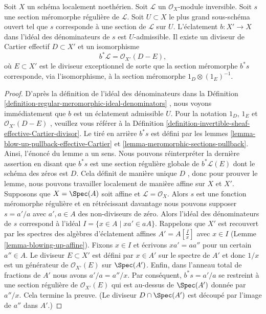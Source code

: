 \begin{lemma}
\label{lemma-blowing-up-denominators}
Soit  $X$  un schéma localement noethérien. Soit  $\mathcal{L}$  un
 $\mathcal{O}_X$-module inversible. Soit  $s$  une section méromorphe régulière
de  $\mathcal{L}$. Soit  $U \subset X$  le plus grand sous-schéma ouvert tel que
 $s$  corresponde à une section de  $\mathcal{L}$  sur  $U$.
L'éclatement  $b : X' \to X$  dans l'idéal des dénominateurs de  $s$  est
 $U$-admissible. Il existe un diviseur de Cartier effectif  $D \subset X'$  et
un isomorphisme
$$
b^*\mathcal{L} = \mathcal{O}_{X'}(D - E),
$$
où  $E \subset X'$  est le diviseur exceptionnel de sorte que la section méromorphe
 $b^*s$  corresponde, via l'isomorphisme, à la section méromorphe
 $1_D \otimes (1_E)^{-1}$.
\end{lemma}

\begin{proof}
D'après la définition de l'idéal des dénominateurs dans la Définition
 \ref{definition-regular-meromorphic-ideal-denominators} , nous voyons immédiatement que  $b$  est un éclatement
admissible  $U$. Pour la notation  $1_D$,  $1_E$ et
 $\mathcal{O}_{X'}(D - E)$ , veuillez vous référer à la Définition  \ref{definition-invertible-sheaf-effective-Cartier-divisor}. Le tiré en
arrière  $b^*s$  est défini par les lemmes  \ref{lemma-blow-up-pullback-effective-Cartier}  et  \ref{lemma-meromorphic-sections-pullback}.
Ainsi, l'énoncé du lemme a un sens. Nous pouvons réinterpréter la dernière
assertion en disant que  $b^*s$  est une section régulière globale de
 $b^*\mathcal{L}(E)$  dont le schéma des zéros est  $D$. Cela définit de manière
unique  $D$ , donc pour prouver le lemme, nous pouvons travailler
localement de manière affine sur  $X$  et  $X'$. Supposons que
 $X = \Spec(A)$  soit affine et  $\mathcal{L} = \mathcal{O}_X$. Alors  $s$  est une fonction
méromorphe régulière et en rétrécissant davantage nous pouvons supposer
 $s = a'/a$  avec  $a', a \in A$  des non-diviseurs de zéro. Alors l'idéal des
dénominateurs de  $s$  correspond à l'idéal  $I = \{x \in A \mid xa' \in aA\}$. Rappelons que
 $X'$  est recouvert par les spectres des algèbres d'éclatement affines
 $A' = A[\frac{I}{x}]$  avec  $x \in I$  (Lemme  \ref{lemma-blowing-up-affine}). Fixons  $x \in I$  et
écrivons  $xa' = a a''$  pour un certain  $a'' \in A$. Le diviseur  $E \subset X'$  est
défini par  $x \in A'$  sur le spectre de  $A'$  et donc  $1/x$  est un
générateur de  $\mathcal{O}_{X'}(E)$  sur  $\Spec(A')$. Enfin, dans l'anneau total de
fractions de  $A'$  nous avons  $a'/a = a''/x$. Par conséquent,  $b^*s = a'/a$  se
restreint à une section régulière de  $\mathcal{O}_{X'}(E)$  qui est au-dessus de
 $\Spec(A')$  donnée par  $a''/x$. Cela termine la preuve. (Le diviseur
 $D \cap \Spec(A')$  est découpé par l'image de  $a''$  dans  $A'$.)
\end{proof}





